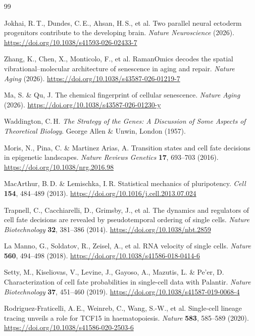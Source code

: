 \documentclass[11pt]{article}
\begin{document}
\begin{thebibliography}{99}

Jokhai, R.\,T., Dundes, C.\,E., Ahsan, H.\,S., et al.
Two parallel neural ectoderm progenitors contribute to the developing brain.
\textit{Nature Neuroscience} (2026).
\url{https://doi.org/10.1038/s41593-026-02433-7}

Zhang, K., Chen, X., Monticolo, F., et al.
RamanOmics decodes the spatial vibrational--molecular architecture of senescence in aging and repair.
\textit{Nature Aging} (2026).
\url{https://doi.org/10.1038/s43587-026-01219-7}

Ma, S. \& Qu, J.
The chemical fingerprint of cellular senescence.
\textit{Nature Aging} (2026).
\url{https://doi.org/10.1038/s43587-026-01230-y}

Waddington, C.\,H.
\textit{The Strategy of the Genes: A Discussion of Some Aspects of Theoretical Biology}.
George Allen \& Unwin, London (1957).

Moris, N., Pina, C. \& Martinez Arias, A.
Transition states and cell fate decisions in epigenetic landscapes.
\textit{Nature Reviews Genetics} \textbf{17}, 693--703 (2016).
\url{https://doi.org/10.1038/nrg.2016.98}

MacArthur, B.\,D. \& Lemischka, I.\,R.
Statistical mechanics of pluripotency.
\textit{Cell} \textbf{154}, 484--489 (2013).
\url{https://doi.org/10.1016/j.cell.2013.07.024}

Trapnell, C., Cacchiarelli, D., Grimsby, J., et al.
The dynamics and regulators of cell fate decisions are revealed by pseudotemporal ordering of single cells.
\textit{Nature Biotechnology} \textbf{32}, 381--386 (2014).
\url{https://doi.org/10.1038/nbt.2859}

La Manno, G., Soldatov, R., Zeisel, A., et al.
RNA velocity of single cells.
\textit{Nature} \textbf{560}, 494--498 (2018).
\url{https://doi.org/10.1038/s41586-018-0414-6}

Setty, M., Kiseliovas, V., Levine, J., Gayoso, A., Mazutis, L. \& Pe'er, D.
Characterization of cell fate probabilities in single-cell data with Palantir.
\textit{Nature Biotechnology} \textbf{37}, 451--460 (2019).
\url{https://doi.org/10.1038/s41587-019-0068-4}

Rodriguez-Fraticelli, A.\,E., Weinreb, C., Wang, S.-W., et al.
Single-cell lineage tracing unveils a role for TCF15 in haematopoiesis.
\textit{Nature} \textbf{583}, 585--589 (2020).
\url{https://doi.org/10.1038/s41586-020-2503-6}


\end{thebibliography}
\end{document}
